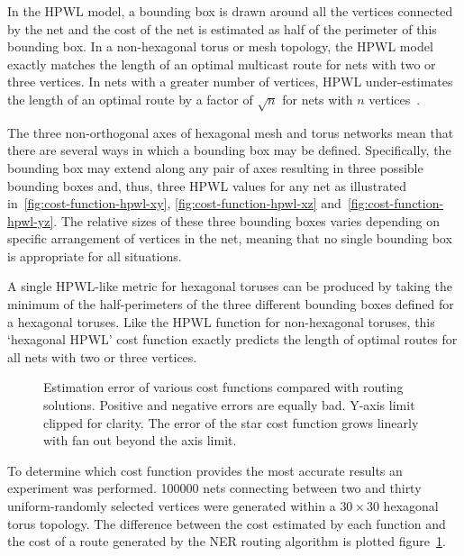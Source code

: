 				In the HPWL model, a bounding box is drawn around all the vertices
				connected by the net and the cost of the net is estimated as half of
				the perimeter of this bounding box. In a non-hexagonal torus or mesh
				topology, the HPWL model exactly matches the length of an optimal
				multicast route for nets with two or three vertices. In nets with a
				greater number of vertices, HPWL under-estimates the length of an
				optimal route by a factor of $\sqrt{n}$ for nets with $n$
				vertices~\cite{chung79}.
				
				The three non-orthogonal axes of hexagonal mesh and torus networks mean
				that there are several ways in which a bounding box may be defined.
				Specifically, the bounding box may extend along any pair of axes
				resulting in three possible bounding boxes and, thus, three HPWL values
				for any net as illustrated in~\ref{fig:cost-function-hpwl-xy},
				\ref{fig:cost-function-hpwl-xz} and~\ref{fig:cost-function-hpwl-yz}.
				The relative sizes of these three bounding boxes varies depending on
				specific arrangement of vertices in the net, meaning that no single
				bounding box is appropriate for all situations.
				
				A single HPWL-like metric for hexagonal toruses can be produced by
				taking the minimum of the half-perimeters of the three different
				bounding boxes defined for a hexagonal toruses. Like the HPWL function
				for non-hexagonal toruses, this `hexagonal HPWL' cost function exactly
				predicts the length of optimal routes for all nets with two or three
				vertices.
				
				\begin{figure}
					\center
					
					\caption[Estimation error of various cost functions.]%
					{Estimation error of various cost functions compared with
					routing solutions. Positive and negative errors are equally bad.
					Y-axis limit clipped for clarity. The error of the star cost function
					grows linearly with fan out beyond the axis limit.}
					\label{fig:cost-function-error}
				\end{figure}
				
				To determine which cost function provides the most accurate results an
				experiment was performed. \num{100000} nets connecting between two and
				thirty uniform-randomly selected vertices were generated within a
				$30\times30$ hexagonal torus topology. The difference between the cost
				estimated by each function and the cost of a route generated by the NER
				routing algorithm is plotted figure~\ref{fig:cost-function-error}.
				
